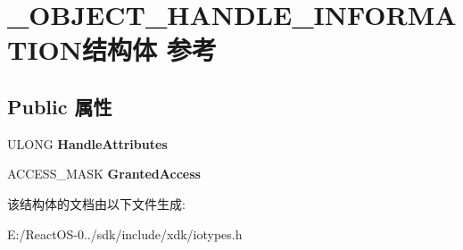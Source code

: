 \hypertarget{struct___o_b_j_e_c_t___h_a_n_d_l_e___i_n_f_o_r_m_a_t_i_o_n}{}\section{\+\_\+\+O\+B\+J\+E\+C\+T\+\_\+\+H\+A\+N\+D\+L\+E\+\_\+\+I\+N\+F\+O\+R\+M\+A\+T\+I\+O\+N结构体 参考}
\label{struct___o_b_j_e_c_t___h_a_n_d_l_e___i_n_f_o_r_m_a_t_i_o_n}
\subsection*{Public 属性}
\begin{DoxyCompactItemize}
\item 
\mbox{\label{struct___o_b_j_e_c_t___h_a_n_d_l_e___i_n_f_o_r_m_a_t_i_o_n_afb307edd827a67ffeb57844f2a436202}} 
U\+L\+O\+NG {\bfseries Handle\+Attributes}
\item 
\mbox{\label{struct___o_b_j_e_c_t___h_a_n_d_l_e___i_n_f_o_r_m_a_t_i_o_n_a63cd4d66488b8f6ea1ba57165d6bbea8}} 
A\+C\+C\+E\+S\+S\+\_\+\+M\+A\+SK {\bfseries Granted\+Access}
\end{DoxyCompactItemize}


该结构体的文档由以下文件生成\+:\begin{DoxyCompactItemize}
\item 
E\+:/\+React\+O\+S-\/0../sdk/include/xdk/iotypes.\+h\end{DoxyCompactItemize}
